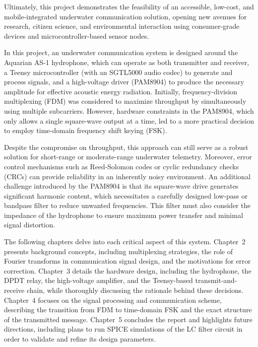 Ultimately, this project demonstrates the feasibility of an accessible, low-cost, and mobile-integrated underwater communication solution, opening new avenues for research, citizen science, and environmental interaction using consumer-grade devices and microcontroller-based sensor nodes.

In this project, an underwater communication system is designed around the Aquarian AS-1 hydrophone, which can operate as both transmitter and receiver, a Teensy microcontroller (with an SGTL5000 audio codec) to generate and process signals, and a high-voltage driver (PAM8904) to produce the necessary amplitude for effective acoustic energy radiation. Initially, frequency-division multiplexing (FDM) was considered to maximize throughput by simultaneously using multiple subcarriers. However, hardware constraints in the PAM8904, which only allows a single square-wave output at a time, led to a more practical decision to employ time-domain frequency shift keying (FSK). 

Despite the compromise on throughput, this approach can still serve as a robust solution for short-range or moderate-range underwater telemetry. Moreover, error control mechanisms such as Reed-Solomon codes or cyclic redundancy checks (CRCs) can provide reliability in an inherently noisy environment. An additional challenge introduced by the PAM8904 is that its square-wave drive generates significant harmonic content, which necessitates a carefully designed low-pass or bandpass filter to reduce unwanted frequencies. This filter must also consider the impedance of the hydrophone to ensure maximum power transfer and minimal signal distortion.

The following chapters delve into each critical aspect of this system. Chapter~2 presents background concepts, including multiplexing strategies, the role of Fourier transforms in communication signal design, and the motivations for error correction. Chapter~3 details the hardware design, including the hydrophone, the DPDT relay, the high-voltage amplifier, and the Teensy-based transmit-and-receive chain, while thoroughly discussing the rationale behind these decisions. Chapter~4 focuses on the signal processing and communication scheme, describing the transition from FDM to time-domain FSK and the exact structure of the transmitted message. Chapter~5 concludes the report and highlights future directions, including plans to run SPICE simulations of the LC filter circuit in order to validate and refine its design parameters.

